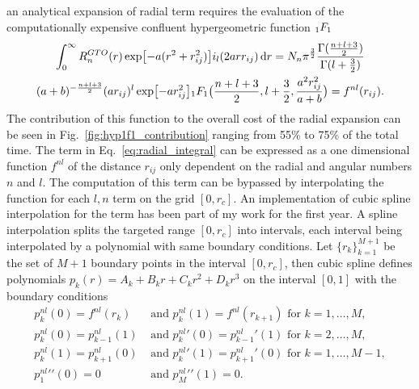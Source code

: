 an analytical expansion of radial term requires the evaluation of the computationally expensive confluent hypergeometric function ${}_{1}F_{1}$ 
\begin{multline}
    \label{eq:radial_integral}
    \int_0^{\infty} R_n^{GTO}(r) \exp[-a(r^2+r_{ij}^2)]i_l(2arr_{ij}) \,\mathrm{d}r
    = N_n \pi^{\frac32}\frac{\Gamma(\frac{n+l+3}{2})}{\Gamma(l+\frac32)} \\
    (a+b)^{-\frac{n+l+3}{2}} (ar_{ij})^l \exp[-ar_{ij}^2] {}_{1}F_{1}\big(\frac{n+l+3}{2},l+\frac32,\frac{a^2r_{ij}^2}{a+b}\big) = f^{nl}(r_{ij}).
\end{multline}
The contribution of this function to the overall cost of the radial expansion can be seen in Fig.~\ref{fig:hyp1f1_contribution} ranging from 55\% to 75\%  of the total time.
The term in Eq.~\ref{eq:radial_integral} can be expressed as a one dimensional function $f^{nl}$ of the distance $r_{ij}$ only dependent on the radial and angular numbers $n$ and $l$.
The computation of this term can be bypassed by interpolating the function for each $l,n$ term on the grid $[0,r_c]$.
An implementation of cubic spline interpolation for the term has been part of my work for the first year.
A spline interpolation splits the targeted range $[0,r_c]$ into intervals, each interval being interpolated by a polynomial with same boundary conditions.
Let $\{r_k\}_{k=1}^{M+1}$ be the set of $M+1$ boundary points in the interval $[0,r_c]$, then cubic spline defines polynomials $p_k(r) = A_k + B_kr + C_kr^2 + D_kr^3$ on the interval $[0,1]$ with the boundary conditions
\begin{subequations}
\begin{align} 
    p^{nl}_{k}(0) = f^{nl}(r_k)&\text{ and } p^{nl}_{k}(1) =  f^{nl}(r_{k+1})\text{ for } k=1,\ldots,M , \label{eq:function_boundary_conditions}\\
    p^{nl}_{k}(0) = p^{nl}_{k-1}(1)&\text{ and } p^{nl}_{k}\prime(0)= p^{nl}_{k-1}\prime(1) \text{ for } k=2,\ldots,M  ,\label{eq:points_boundary_conditions}\\
    p^{nl}_k(1) = p^{nl}_{k+1}(0)&\text{ and }  p^{nl}_k\prime(1) = p^{nl}_{k+1}\prime(0) \text{ for } k=1,\ldots,M-1 ,\label{eq:derivative_boundary_conditions}\\
    p^{nl}_{1}\prime\prime(0) = 0&\text{ and } p^{nl}_{M}\prime\prime(1) = 0.\label{eq:natural_boundary_conditions}
\end{align}
\end{subequations}
